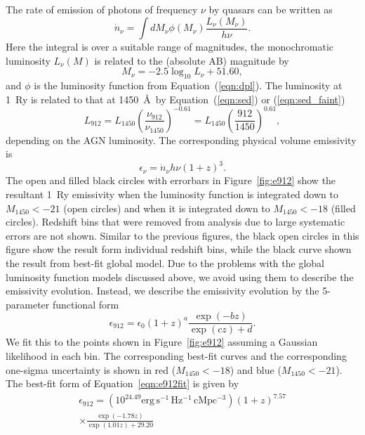 \documentclass[a4paper,fleqn,usenatbib]{mnras}
\begin{document}
The rate of emission of photons of frequency $\nu$ by quasars can be
written as
\begin{equation}
\dot n_\nu = \int dM_\nu \phi(M_\nu) \frac{L_\nu(M_\nu)}{h\nu}.
\end{equation}
Here the integral is over a suitable range of magnitudes, the
monochromatic luminosity $L_\nu(M)$ is related to the (absolute AB)
magnitude by \citep{1983ApJ...266..713O}
\begin{equation}
M_\nu = -2.5\log_{10}L_\nu+51.60,
\end{equation}
and $\phi$ is the luminosity function from Equation~(\ref{eqn:dpl}).
The luminosity at 1~Ry is related to that at 1450~\AA\ by
Equation~(\ref{eqn:sed}) or (\ref{eqn:sed_faint})
\begin{equation}
  L_{912}=L_{1450}\left(\frac{\nu_{912}}{\nu_{1450}}\right)^{-0.61}=L_{1450}\left(\frac{912}{1450}\right)^{0.61},
\end{equation}
depending on the AGN luminosity.  The corresponding physical volume
emissivity is 
\begin{equation}
\epsilon_\nu = \dot n_\nu h\nu (1+z)^3.
\label{eqn:epsilon}
\end{equation}
The open and filled black circles with errorbars in
Figure~\ref{fig:e912} show the resultant 1~Ry emissivity when the
luminosity function is integrated down to $M_{1450}<-21$ (open
circles) and when it is integrated down to $M_{1450}<-18$ (filled
circles).  Redshift bins that were removed from analysis due to large
systematic errors are not shown.  Similar to the previous figures, the
black open circles in this figure show the result form individual
redshift bins, while the black curve shown the result from best-fit
global model.  Due to the problems with the global luminosity function
models discussed above, we avoid using them to describe the emissivity
evolution.  Instead, we describe the emissivity evolution by the
5-parameter functional form \citep{2012ApJ...746..125H}
\begin{equation}
  \epsilon_{912}=\epsilon_0(1+z)^a\frac{\exp(-bz)}{\exp(cz)+d}.
  \label{eqn:e912fit}
\end{equation}
We fit this to the points shown in Figure~\ref{fig:e912} assuming a
Gaussian likelihood in each bin.  The corresponding best-fit curves
and the corresponding one-sigma uncertainty is shown in red
($M_{1450}<-18$) and blue ($M_{1450}<-21$).  The best-fit form of
Equation~\ref{eqn:e912fit} is given by 
\begin{multline}
  \epsilon_{912}=(10^{24.49}\mathrm{erg\, s^{-1}\, Hz^{-1}\, cMpc^{-3}})(1+z)^{7.57}\\\times\frac{\exp(-1.78z)}{\exp(1.01z)+29.20}
\end{multline}
\end{document}
